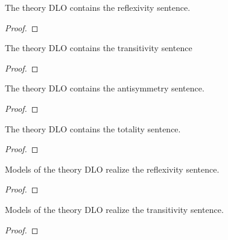 
\begin{lemma}
    \label{lem:reflexive-in-dlo}
    \leanok
    The theory DLO contains the reflexivity sentence.
\end{lemma}
\begin{proof}
    \leanok
\end{proof}

\begin{lemma}
    \label{lem:transitive-in-dlo}
    \leanok
    The theory DLO contains the transitivity sentence
\end{lemma}
\begin{proof}
    \leanok
\end{proof}

\begin{lemma}
    \label{lem:antisymmetric-in-dlo}
    \leanok
    The theory DLO contains the antisymmetry sentence.
\end{lemma}
\begin{proof}
    \leanok
\end{proof}

\begin{lemma}
    \label{lem:total-in-dlo}
    \leanok
    The theory DLO contains the totality sentence.
\end{lemma}
\begin{proof}
    \leanok
\end{proof}

\begin{lemma}
    \label{lem:models-of-dlo-realize-reflexivity}
    \leanok
    Models of the theory DLO realize the reflexivity sentence.
\end{lemma}
\begin{proof}
    \leanok
\end{proof}

\begin{lemma}
    \label{lem:models-of-dlo-realize-transitivity}
    \leanok
    Models of the theory DLO realize the transitivity sentence.
\end{lemma}
\begin{proof}
    \leanok
\end{proof}

